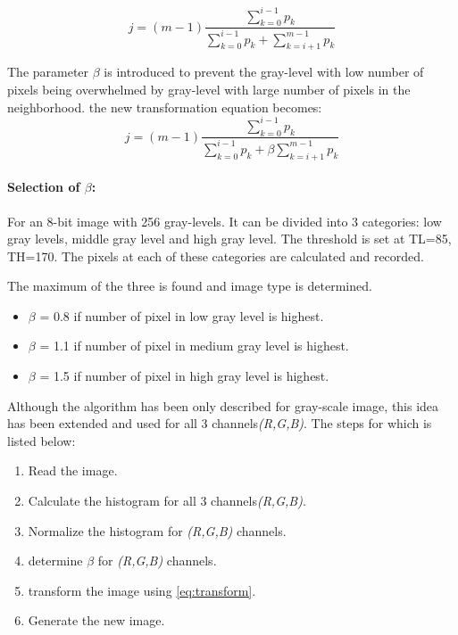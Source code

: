 \documentclass[12pt, a4paper, font = Times New Roman]{article}
\begin{document}
\begin{equation}
j = (m-1)\frac{\sum_{k=0}^{i-1}{p_k}}{\sum_{k=0}^{i-1}{p_k} + \sum_{k=i+1}^{m-1}{p_k}}
\end{equation}

\par
The parameter $\beta$ is introduced to prevent the gray-level with low number of pixels being overwhelmed by gray-level with large number of pixels in the neighborhood. the new transformation equation becomes:
\begin{equation}\label{eq:transform}
j = (m-1)\frac{\sum_{k=0}^{i-1}{p_k}}{\sum_{k=0}^{i-1}{p_k} + \beta \sum_{k=i+1}^{m-1}{p_k}}
\end{equation}
\paragraph{Selection of $\beta$:}
\par
For an 8-bit image with 256 gray-levels. It can be divided into 3 categories: low gray levels, middle gray level and high gray level. The threshold is set at TL=85, TH=170. The pixels at each of these categories are calculated and recorded.
\par
The maximum of the three is found and image type is determined.
\begin{itemize}
\item $\beta$ = 0.8 if number of pixel in low gray level is highest.
\item $\beta$ = 1.1 if number of pixel in medium gray level is highest.
\item $\beta$ = 1.5 if number of pixel in high gray level is highest.
\end{itemize}
\par
Although the algorithm has been only described for gray-scale image, this idea has been extended and used for all 3 channels\emph{(R,G,B)}. The steps for which is listed below:

\begin{enumerate}
\item Read the image.
\item Calculate the histogram for all 3 channels\emph{(R,G,B)}.
\item Normalize the histogram for \emph{(R,G,B)} channels.
\item determine $\beta$ for \emph{(R,G,B)} channels.
\item transform the image using \ref{eq:transform}.
\item Generate the new image.
\end{enumerate}
\end{document}
